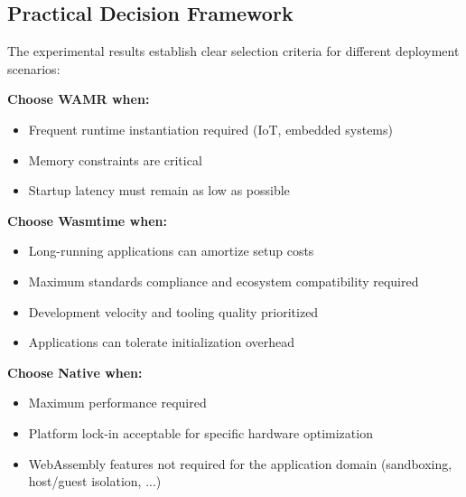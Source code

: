 


\subsection{Practical Decision Framework}
\label{subsec:decision-framework}

The experimental results establish clear selection criteria for different deployment scenarios:

\textbf{Choose WAMR when:}
\begin{itemize}
    \item Frequent runtime instantiation required (IoT, embedded systems)
    \item Memory constraints are critical 
    \item Startup latency must remain as low as possible
\end{itemize}

\textbf{Choose Wasmtime when:}
\begin{itemize}
    \item Long-running applications can amortize setup costs
    \item Maximum standards compliance and ecosystem compatibility required
    \item Development velocity and tooling quality prioritized
    \item Applications can tolerate initialization overhead
\end{itemize}

\textbf{Choose Native when:}
\begin{itemize}
    \item Maximum performance required
    \item Platform lock-in acceptable for specific hardware optimization
    \item WebAssembly features not required for the application domain (sandboxing, host/guest isolation, ...)
\end{itemize}

